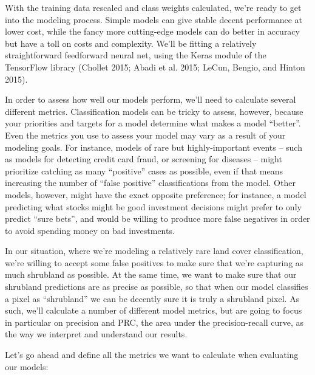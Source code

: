 \documentclass[
  letterpaper,
  DIV=11,
  numbers=noendperiod]{scrartcl}
\begin{document}
With the training data rescaled and class weights calculated, we're
ready to get into the modeling process. Simple models can give stable
decent performance at lower cost, while the fancy more cutting-edge
models can do better in accuracy but have a toll on costs and
complexity. We'll be fitting a relatively straightforward feedforward
neural net, using the Keras module of the TensorFlow library (Chollet
2015; Abadi et al. 2015; LeCun, Bengio, and Hinton 2015).

In order to assess how well our models perform, we'll need to calculate
several different metrics. Classification models can be tricky to
assess, however, because your priorities and targets for a model
determine what makes a model ``better''. Even the metrics you use to
assess your model may vary as a result of your modeling goals. For
instance, models of rare but highly-important events -- such as models
for detecting credit card fraud, or screening for diseases -- might
prioritize catching as many ``positive'' cases as possible, even if that
means increasing the number of ``false positive'' classifications from
the model. Other models, however, might have the exact opposite
preference; for instance, a model predicting what stocks might be good
investment decisions might prefer to only predict ``sure bets'', and
would be willing to produce more false negatives in order to avoid
spending money on bad investments.

In our situation, where we're modeling a relatively rare land cover
classification, we're willing to accept some false positives to make
sure that we're capturing as much shrubland as possible. At the same
time, we want to make sure that our shrubland predictions are as precise
as possible, so that when our model classifies a pixel as ``shrubland''
we can be decently sure it is truly a shrubland pixel. As such, we'll
calculate a number of different model metrics, but are going to focus in
particular on precision and PRC, the area under the precision-recall
curve, as the way we interpret and understand our results.

Let's go ahead and define all the metrics we want to calculate when
evaluating our models:
\end{document}
